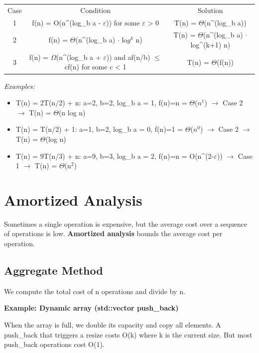 \begin{center}
\begin{tabular}{ccc}
\toprule
Case & Condition & Solution \\
1 & f(n) = O(n\textasciicircum{}(log\_b a - $\varepsilon $)) for some $\varepsilon $ > 0 & T(n) = $\Theta $(n\textasciicircum{}(log\_b a)) \\
2 & f(n) = $\Theta $(n\textasciicircum{}(log\_b a) $\cdot $ lo$g^{k}$ n) & T(n) = $\Theta $(n\textasciicircum{}(log\_b a) $\cdot $ log\textasciicircum{}(k+1) n) \\
3 & f(n) = $\Omega $(n\textasciicircum{}(log\_b a + $\varepsilon $)) and af(n/b) $\le $ cf(n) for some c < 1 & T(n) = $\Theta $(f(n)) \\

\bottomrule
\end{tabular}
\end{center}
\textit{Examples:}
\begin{itemize}
\item T(n) = 2T(n/2) + n: a=2, b=2, log\_b a = 1, f(n)=n = $\Theta $($n^{1}$) $\to $ Case 2 $\to $ T(n) = $\Theta $(n log n)
\item T(n) = T(n/2) + 1: a=1, b=2, log\_b a = 0, f(n)=1 = $\Theta $($n^{0}$) $\to $ Case 2 $\to $ T(n) = $\Theta $(log n)
\item T(n) = 9T(n/3) + n: a=9, b=3, log\_b a = 2, f(n)=n = O(n\textasciicircum{}(2-$\varepsilon $)) $\to $ Case 1 $\to $ T(n) = $\Theta $(n$^{2}$)
\end{itemize}

\section{Amortized Analysis}

Sometimes a single operation is expensive, but the average cost over a sequence of operations is low. \textbf{Amortized analysis} bounds the average cost per operation.

\subsection{Aggregate Method}

We compute the total cost of n operations and divide by n.

\textbf{Example: Dynamic array (std::vector push\_back)}

When the array is full, we double its capacity and copy all elements. A push\_back that triggers a resize costs O(k) where k is the current size. But most push\_back operations cost O(1).

